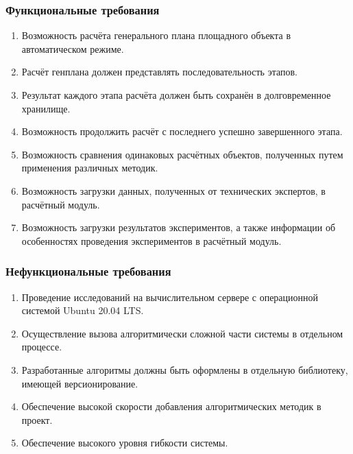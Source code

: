 \begin{frame}
\frametitle{Функциональные требования}
\begin{enumerate}
    \item {
        Возможность расчёта генерального плана площадного объекта в автоматическом режиме.
    }
    \item {
        Расчёт генплана должен представлять последовательность этапов.
    }
    \item {
        Результат каждого этапа расчёта должен быть сохранён в долговременное хранилище.
    }
    \item {
        Возможность продолжить расчёт с последнего успешно завершенного этапа.
    }
    \item {
        Возможность сравнения одинаковых расчётных объектов, полученных путем применения различных методик.
    }
    \item {
        Возможность загрузки данных, полученных от технических экспертов, в расчётный модуль.
    }
    \item {
        Возможность загрузки результатов экспериментов, а также информации об особенностях
        проведения экспериментов в расчётный модуль.
    }
\end{enumerate}
\end{frame}


\begin{frame}
\frametitle{Нефункциональные требования}
\begin{enumerate}
    \item {
        Проведение исследований на вычислительном сервере с операционной системой Ubuntu 20.04 LTS.
    }
    \item {
        Осуществление вызова алгоритмически сложной части системы в отдельном процессе.
    }
    \item {
        Разработанные алгоритмы должны быть оформлены в отдельную библиотеку, имеющей версионирование.
    }
    \item {
        Обеспечение высокой скорости добавления алгоритмических методик в проект.
    }
    \item {
        Обеспечение высокого уровня гибкости системы.
    }
\end{enumerate}
\end{frame}